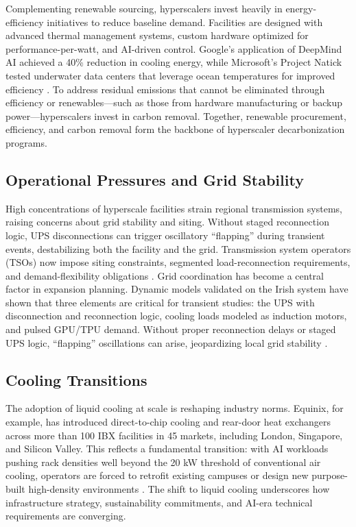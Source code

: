 \documentclass[conference]{IEEEtran}
\begin{document}
Complementing renewable sourcing, hyperscalers invest heavily in energy-efficiency initiatives to reduce baseline demand. Facilities are designed with advanced thermal management systems, custom hardware optimized for performance-per-watt, and AI-driven control. Google's application of DeepMind AI achieved a 40\% reduction in cooling energy, while Microsoft's Project Natick tested underwater data centers that leverage ocean temperatures for improved efficiency \cite{Cruzes2026}. To address residual emissions that cannot be eliminated through efficiency or renewables---such as those from hardware manufacturing or backup power---hyperscalers invest in carbon removal. Together, renewable procurement, efficiency, and carbon removal form the backbone of hyperscaler decarbonization programs.

\subsection{Operational Pressures and Grid Stability}

High concentrations of hyperscale facilities strain regional transmission systems, raising concerns about grid stability and siting. Without staged reconnection logic, UPS disconnections can trigger oscillatory ``flapping'' during transient events, destabilizing both the facility and the grid. Transmission system operators (TSOs) now impose siting constraints, segmented load-reconnection requirements, and demand-flexibility obligations \cite{Cruzes2026}. Grid coordination has become a central factor in expansion planning. Dynamic models validated on the Irish system have shown that three elements are critical for transient studies: the UPS with disconnection and reconnection logic, cooling loads modeled as induction motors, and pulsed GPU/TPU demand. Without proper reconnection delays or staged UPS logic, ``flapping'' oscillations can arise, jeopardizing local grid stability \cite{Cruzes2026}.

\subsection{Cooling Transitions}

The adoption of liquid cooling at scale is reshaping industry norms. Equinix, for example, has introduced direct-to-chip cooling and rear-door heat exchangers across more than 100 IBX facilities in 45 markets, including London, Singapore, and Silicon Valley. This reflects a fundamental transition: with AI workloads pushing rack densities well beyond the 20 kW threshold of conventional air cooling, operators are forced to retrofit existing campuses or design new purpose-built high-density environments \cite{Cruzes2026}. The shift to liquid cooling underscores how infrastructure strategy, sustainability commitments, and AI-era technical requirements are converging.
\end{document}
